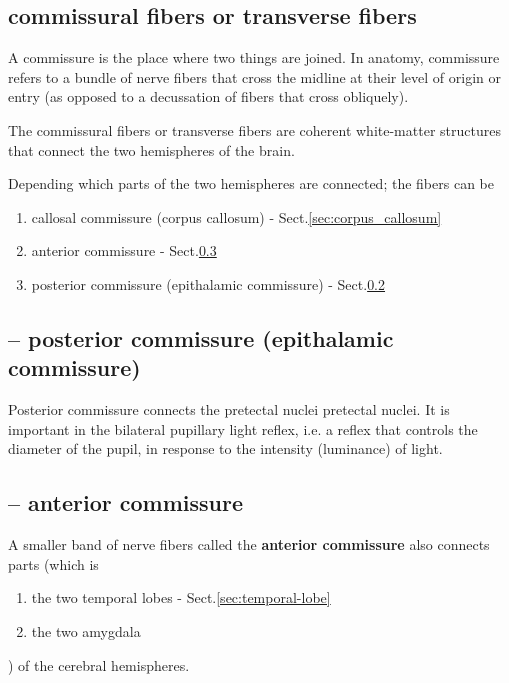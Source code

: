 \subsection{commissural fibers or transverse fibers}
\label{sec:commissural-fibers}
\label{sec:transverse-fibers}

A commissure is the place where two things are joined. In anatomy, commissure
refers to a bundle of nerve fibers that cross the midline at their level of
origin or entry (as opposed to a decussation of fibers that cross obliquely). 

The commissural fibers or transverse fibers are coherent white-matter structures
that connect the two hemispheres of the brain.

Depending which parts of the two hemispheres are connected; the fibers can be
\begin{enumerate}
  \item callosal commissure (corpus callosum) - Sect.\ref{sec:corpus_callosum} 
  
  \item anterior commissure - Sect.\ref{sec:anterior-commissure}
  
  \item posterior commissure (epithalamic commissure) -
  Sect.\ref{sec:posterior-commisure}
\end{enumerate}

\subsection{-- posterior commissure (epithalamic commissure)}
\label{sec:posterior-commisure}

Posterior commissure connects the pretectal nuclei pretectal nuclei. It is
important in the bilateral pupillary light reflex, i.e.
a reflex that controls the diameter of the pupil, in response to the intensity
(luminance) of light.

\subsection{-- anterior commissure}
\label{sec:anterior-commissure}

A smaller band of nerve fibers called the {\bf anterior commissure} also
connects parts (which is  
\begin{enumerate}
  \item the two temporal lobes - Sect.\ref{sec:temporal-lobe}
  \item the two amygdala
\end{enumerate}
) of the cerebral hemispheres.

